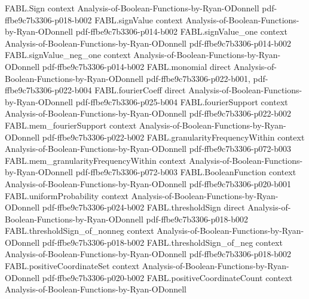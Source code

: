 \begin{theorem}
\label{FABL.booleanInfluence_dictator_self}
\leanok
{}
\proofstep
  {FABL.Sign}
  {context}
  {Analysis-of-Boolean-Functions-by-Ryan-ODonnell}
  {pdf-ffbe9c7b3306-p018-b002}
\proofstep
  {FABL.signValue}
  {context}
  {Analysis-of-Boolean-Functions-by-Ryan-ODonnell}
  {pdf-ffbe9c7b3306-p014-b002}
\proofstep
  {FABL.signValue_one}
  {context}
  {Analysis-of-Boolean-Functions-by-Ryan-ODonnell}
  {pdf-ffbe9c7b3306-p014-b002}
\proofstep
  {FABL.signValue_neg_one}
  {context}
  {Analysis-of-Boolean-Functions-by-Ryan-ODonnell}
  {pdf-ffbe9c7b3306-p014-b002}
\proofstep
  {FABL.monomial}
  {direct}
  {Analysis-of-Boolean-Functions-by-Ryan-ODonnell}
  {pdf-ffbe9c7b3306-p022-b001,
    pdf-ffbe9c7b3306-p022-b004}
\proofstep
  {FABL.fourierCoeff}
  {direct}
  {Analysis-of-Boolean-Functions-by-Ryan-ODonnell}
  {pdf-ffbe9c7b3306-p025-b004}
\proofstep
  {FABL.fourierSupport}
  {context}
  {Analysis-of-Boolean-Functions-by-Ryan-ODonnell}
  {pdf-ffbe9c7b3306-p022-b002}
\proofstep
  {FABL.mem_fourierSupport}
  {context}
  {Analysis-of-Boolean-Functions-by-Ryan-ODonnell}
  {pdf-ffbe9c7b3306-p022-b002}
\proofstep
  {FABL.granularityFrequencyWithin}
  {context}
  {Analysis-of-Boolean-Functions-by-Ryan-ODonnell}
  {pdf-ffbe9c7b3306-p072-b003}
\proofstep
  {FABL.mem_granularityFrequencyWithin}
  {context}
  {Analysis-of-Boolean-Functions-by-Ryan-ODonnell}
  {pdf-ffbe9c7b3306-p072-b003}
\proofstep
  {FABL.BooleanFunction}
  {context}
  {Analysis-of-Boolean-Functions-by-Ryan-ODonnell}
  {pdf-ffbe9c7b3306-p020-b001}
\proofstep
  {FABL.uniformProbability}
  {context}
  {Analysis-of-Boolean-Functions-by-Ryan-ODonnell}
  {pdf-ffbe9c7b3306-p024-b002}
\proofstep
  {FABL.thresholdSign}
  {direct}
  {Analysis-of-Boolean-Functions-by-Ryan-ODonnell}
  {pdf-ffbe9c7b3306-p018-b002}
\proofstep
  {FABL.thresholdSign_of_nonneg}
  {context}
  {Analysis-of-Boolean-Functions-by-Ryan-ODonnell}
  {pdf-ffbe9c7b3306-p018-b002}
\proofstep
  {FABL.thresholdSign_of_neg}
  {context}
  {Analysis-of-Boolean-Functions-by-Ryan-ODonnell}
  {pdf-ffbe9c7b3306-p018-b002}
\proofstep
  {FABL.positiveCoordinateSet}
  {context}
  {Analysis-of-Boolean-Functions-by-Ryan-ODonnell}
  {pdf-ffbe9c7b3306-p020-b002}
\proofstep
  {FABL.positiveCoordinateCount}
  {context}
  {Analysis-of-Boolean-Functions-by-Ryan-ODonnell}

\end{theorem}
